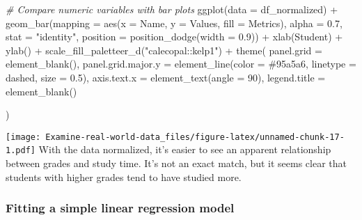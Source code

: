 \documentclass[
]{article}
\newenvironment{Shaded}{\begin{snugshade}}{\end{snugshade}}
\newcommand{\AttributeTok}[1]{\textcolor[rgb]{0.77,0.63,0.00}{#1}}
\newcommand{\CommentTok}[1]{\textcolor[rgb]{0.56,0.35,0.01}{\textit{#1}}}
\newcommand{\DecValTok}[1]{\textcolor[rgb]{0.00,0.00,0.81}{#1}}
\newcommand{\FloatTok}[1]{\textcolor[rgb]{0.00,0.00,0.81}{#1}}
\newcommand{\FunctionTok}[1]{\textcolor[rgb]{0.00,0.00,0.00}{#1}}
\newcommand{\NormalTok}[1]{#1}
\newcommand{\SpecialCharTok}[1]{\textcolor[rgb]{0.00,0.00,0.00}{#1}}
\newcommand{\StringTok}[1]{\textcolor[rgb]{0.31,0.60,0.02}{#1}}
\begin{document}
\begin{Shaded}
\begin{Highlighting}[]
\CommentTok{\# Compare numeric variables with bar plots}
\FunctionTok{ggplot}\NormalTok{(}\AttributeTok{data =}\NormalTok{ df\_normalized) }\SpecialCharTok{+}
  \FunctionTok{geom\_bar}\NormalTok{(}\AttributeTok{mapping =} \FunctionTok{aes}\NormalTok{(}\AttributeTok{x =}\NormalTok{ Name, }\AttributeTok{y =}\NormalTok{ Values, }\AttributeTok{fill =}\NormalTok{ Metrics), }\AttributeTok{alpha =} \FloatTok{0.7}\NormalTok{, }\AttributeTok{stat =} \StringTok{"identity"}\NormalTok{, }\AttributeTok{position =} \FunctionTok{position\_dodge}\NormalTok{(}\AttributeTok{width =} \FloatTok{0.9}\NormalTok{)) }\SpecialCharTok{+}
  \FunctionTok{xlab}\NormalTok{(}\StringTok{\textquotesingle{}Student\textquotesingle{}}\NormalTok{) }\SpecialCharTok{+}
  \FunctionTok{ylab}\NormalTok{(}\StringTok{\textquotesingle{}\textquotesingle{}}\NormalTok{) }\SpecialCharTok{+}
  \FunctionTok{scale\_fill\_paletteer\_d}\NormalTok{(}\StringTok{"calecopal::kelp1"}\NormalTok{) }\SpecialCharTok{+}
  \FunctionTok{theme}\NormalTok{(}
    \AttributeTok{panel.grid =} \FunctionTok{element\_blank}\NormalTok{(),}
    \AttributeTok{panel.grid.major.y =} \FunctionTok{element\_line}\NormalTok{(}\AttributeTok{color =} \StringTok{\textquotesingle{}\#95a5a6\textquotesingle{}}\NormalTok{,}
                                      \AttributeTok{linetype =} \StringTok{\textquotesingle{}dashed\textquotesingle{}}\NormalTok{,}
                                      \AttributeTok{size =} \FloatTok{0.5}\NormalTok{),}
    \AttributeTok{axis.text.x =} \FunctionTok{element\_text}\NormalTok{(}\AttributeTok{angle =} \DecValTok{90}\NormalTok{),}
    \AttributeTok{legend.title =} \FunctionTok{element\_blank}\NormalTok{()}
    
\NormalTok{  )}
\end{Highlighting}
\end{Shaded}

\texttt{[image: Examine-real-world-data\_files/figure-latex/unnamed-chunk-17-1.pdf]}
With the data normalized, it's easier to see an apparent relationship
between grades and study time. It's not an exact match, but it seems
clear that students with higher grades tend to have studied more.

\hypertarget{fitting-a-simple-linear-regression-model}{%
\subsubsection{Fitting a simple linear regression
model}\label{fitting-a-simple-linear-regression-model}}
\end{document}
